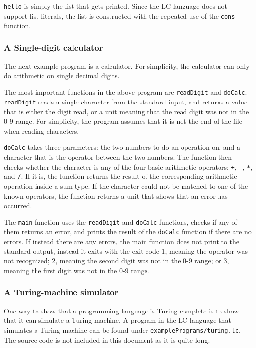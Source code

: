 \documentclass[12pt]{article}
\begin{document}
\verb$hello$ is simply the list that gets printed. Since the LC language does
not support list literals, the list is constructed with the repeated use of the
\verb$cons$ function.

\subsubsection{A Single-digit calculator}

The next example program is a calculator. For simplicity, the calculator can
only do arithmetic on single decimal digits.



The most important functions in the above program are \verb$readDigit$ and
\verb$doCalc$. \verb$readDigit$ reads a single character from the standard
input, and returns a value that is either the digit read, or a unit meaning that
the read digit was not in the 0-9 range. For simplicity, the program assumes
that it is not the end of the file when reading characters.

\verb$doCalc$ takes three parameters: the two numbers to do an operation on, and
a character that is the operator between the two numbers. The function then
checks whether the character is any of the four basic arithmetic operators:
\verb$+$, \verb$-$, \verb$*$, and \verb$/$. If it is, the function returns the
result of the corresponding arithmetic operation inside a sum type. If the
character could not be matched to one of the known operators, the function
returns a unit that shows that an error has occurred.

The \verb$main$ function uses the \verb$readDigit$ and \verb$doCalc$ functions,
checks if any of them returns an error, and prints the result of the
\verb$doCalc$ function if there are no errors. If instead there are any errors,
the main function does not print to the standard output, instead it exits with
the exit code 1, meaning the operator was not recognized; 2, meaning the second
digit was not in the 0-9 range; or 3, meaning the first digit was not in the 0-9
range.

\subsubsection{A Turing-machine simulator} \label{turing-machine-simulator}

One way to show that a programming language is Turing-complete is to show that
it can simulate a Turing machine. A program in the LC language that simulates a
Turing machine can be found under \verb$examplePrograms/turing.lc$. The source
code is not included in this document as it is quite long.
\end{document}
